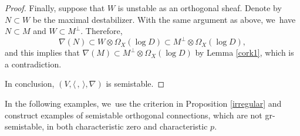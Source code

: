 \documentclass[11pt]{article}
\numberwithin{equation}{section}
\newcommand{\grsemistable}{gr\nobreakdash-semi\-stable\xspace}
\theoremstyle{plain}
\theoremstyle{definition}
\begin{document}
\begin{proof}
Finally, suppose that $W$ is unstable as an orthogonal sheaf. Denote by $N\subset W$ be the maximal destabilizer. With the same argument as above, we~have $N\subset M$ and $W\subset M^\perp$. Therefore,
\[
\nabla(N)\subset W\otimes \Omega_X(\log D)\subset M^\perp\otimes \Omega_X(\log D),
\]
and this implies that $\nabla(M) \subset M^\perp\otimes\Omega_X(\log D)$ by Lemma \ref{cork1}, which is a contradiction.

In conclusion, $(V, \langle \,, \, \rangle, \nabla)$ is semistable.
\end{proof}

In the following examples, we~use the criterion in Proposition \ref{irregular} and construct examples of semistable orthogonal connections, which are not \grsemistable, in both characteristic zero and characteristic $p$.
\end{document}
